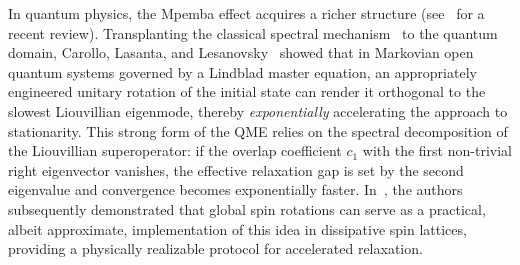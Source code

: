 \documentclass[pdflatex,sn-mathphys-num]{sn-jnl}
\begin{document}
In quantum physics, the Mpemba effect acquires a richer structure (see~\cite{AresReview2025} for a recent review). Transplanting the classical spectral mechanism~\cite{Lu2017,Klich2019} to the quantum domain, Carollo,
Lasanta, and Lesanovsky~\cite{Carollo2021} showed that in Markovian open quantum systems governed by a Lindblad master equation,
an appropriately engineered unitary rotation of the initial state can render it orthogonal to the slowest Liouvillian eigenmode, thereby
\emph{exponentially} accelerating the approach to stationarity. This strong form of the QME relies on the spectral decomposition of
the Liouvillian superoperator: if the overlap coefficient $c_1$ with the first non-trivial right eigenvector vanishes, the effective
relaxation gap is set by the second eigenvalue and convergence becomes exponentially faster. In~\cite{Kochsiek2022}, the authors subsequently demonstrated that global spin rotations can serve as a practical, albeit approximate, implementation of this idea in dissipative spin lattices, providing a physically realizable protocol for accelerated relaxation.
 
\end{document}
